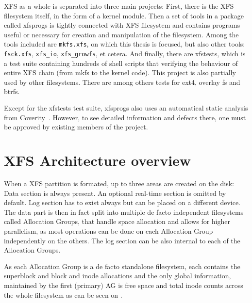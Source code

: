 XFS as a whole is separated into three main projects: First, there is the
XFS filesystem itself, in the form of a kernel module. Then a set of tools
in a package called xfsprogs is tightly connected with XFS filesystem and
contains programs useful or necessary for creation and manipulation of the
filesystem. Among the tools included are {\tt mkfs.xfs}, on which this
thesis is focused, but also other tools: {\tt fsck.xfs}, {\tt xfs\_io},
{\tt xfs\_growfs}, et cetera. And finally, there are xfstests, which is a
test suite containing hundreds of shell scripts that verifying the
behaviour of entire XFS chain (from mkfs to the kernel code). This project
is also partially used by other filesystems. There are among others tests
for ext4, overlay fs and btrfs.

Except for the xfstests test suite, xfsprogs also uses an automatical static analysis from Coverity~\cite{CoverityXfsprogs}. However, to see detailed information and defects there, one must be approved by existing members of the project.


\section{XFS Architecture overview}\label{chap:xfs:overview}

When a XFS partition is formated, up to three areas are created on the disk: Data section is always present. An optional real-time section is omitted by default. Log section has to exist always but can be placed on a different device. The data part is then in fact split into multiple de facto independent filesystems called Allocation Groups, that handle space allocation and allows for higher parallelism, as most operations can be done on each Allocation Group independently on the others. The log section can be also internal to each of the Allocation Groups.

As each Allocation Group is a de facto standalone filesystem, each contains
the superblock and block and inode allocations and the only global
information, maintained by the first (primary) AG is free space and total
inode counts across the whole filesystem as can be seen
on .

